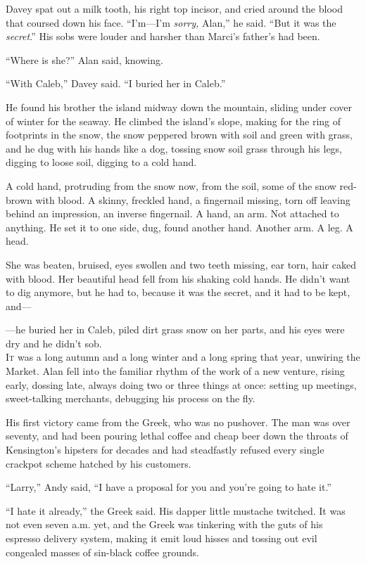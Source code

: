 Davey spat out a milk tooth, his right top incisor, and cried around
the blood that coursed down his face.  ``I'm---I'm \textit{sorry,}
Alan,'' he said.  ``But it was the \textit{secret}.'' His sobs were
louder and harsher than Marci's father's had been.

``Where is she?'' Alan said, knowing.

``With Caleb,'' Davey said.  ``I buried her in Caleb.''

He found his brother the island midway down the mountain, sliding
under cover of winter for the seaway.  He climbed the island's slope,
making for the ring of footprints in the snow, the snow peppered brown
with soil and green with grass, and he dug with his hands like a dog,
tossing snow soil grass through his legs, digging to loose soil,
digging to a cold hand.

A cold hand, protruding from the snow now, from the soil, some of the
snow red-brown with blood.  A skinny, freckled hand, a fingernail
missing, torn off leaving behind an impression, an inverse fingernail. 
A hand, an arm.  Not attached to anything.  He set it to one side,
dug, found another hand.  Another arm.  A leg.  A head.

She was beaten, bruised, eyes swollen and two teeth missing, ear torn,
hair caked with blood.  Her beautiful head fell from his shaking cold
hands.  He didn't want to dig anymore, but he had to, because it was
the secret, and it had to be kept, and---

---he buried her in Caleb, piled dirt grass snow on her parts, and his
eyes were dry and he didn't sob.
\\
\lettrine[lines=3, lhang=.5, nindent=0pt, findent=2pt]{I}{t} was a long autumn and a long winter and a long spring that year,
unwiring the Market.  Alan fell into the familiar rhythm of the work
of a new venture, rising early, dossing late, always doing two or
three things at once:  setting up meetings, sweet-talking merchants,
debugging his process on the fly.

His first victory came from the Greek, who was no pushover.  The man
was over seventy, and had been pouring lethal coffee and cheap beer
down the throats of Kensington's hipsters for decades and had
steadfastly refused every single crackpot scheme hatched by his
customers.

``Larry,'' Andy said, ``I have a proposal for you and you're going to
hate it.''

``I hate it already,'' the Greek said.  His dapper little mustache
twitched.  It was not even seven a.m.  yet, and the Greek was
tinkering with the guts of his espresso delivery system, making it
emit loud hisses and tossing out evil congealed masses of sin-black
coffee grounds.

